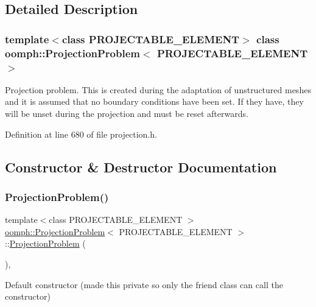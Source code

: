 \subsection{Detailed Description}
\subsubsection*{template$<$class P\+R\+O\+J\+E\+C\+T\+A\+B\+L\+E\+\_\+\+E\+L\+E\+M\+E\+NT$>$\newline
class oomph\+::\+Projection\+Problem$<$ P\+R\+O\+J\+E\+C\+T\+A\+B\+L\+E\+\_\+\+E\+L\+E\+M\+E\+N\+T $>$}

Projection problem. This is created during the adaptation of unstructured meshes and it is assumed that no boundary conditions have been set. If they have, they will be unset during the projection and must be reset afterwards. 

Definition at line 680 of file projection.\+h.



\subsection{Constructor \& Destructor Documentation}
\mbox{\label{classoomph_1_1ProjectionProblem_a4091e944bf95ae7b3cc86ac427d93257}} 
\subsubsection{\texorpdfstring{Projection\+Problem()}{ProjectionProblem()}}
{\footnotesize\ttfamily template$<$class P\+R\+O\+J\+E\+C\+T\+A\+B\+L\+E\+\_\+\+E\+L\+E\+M\+E\+NT $>$ \\
\hyperlink{classoomph_1_1ProjectionProblem}{oomph\+::\+Projection\+Problem}$<$ P\+R\+O\+J\+E\+C\+T\+A\+B\+L\+E\+\_\+\+E\+L\+E\+M\+E\+NT $>$\+::\hyperlink{classoomph_1_1ProjectionProblem}{Projection\+Problem} (\begin{DoxyParamCaption}{ }\end{DoxyParamCaption})\hspace{0.3cm}{\ttfamily [inline]}, {\ttfamily [private]}}

Default constructor (made this private so only the friend class can call the constructor) 

